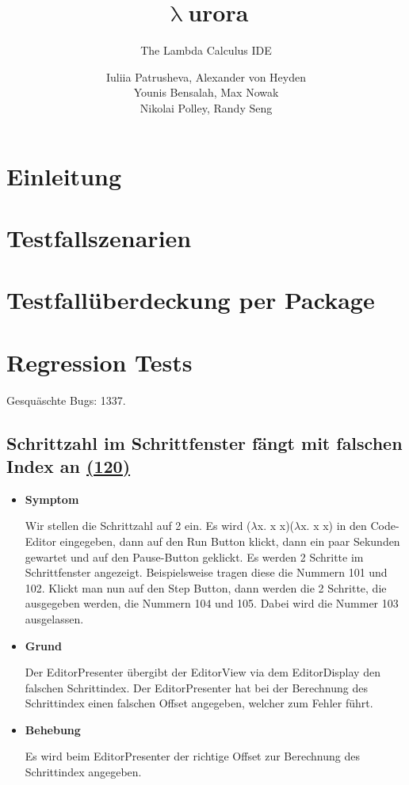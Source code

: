 \documentclass[parskip=full,11pt,twoside]{scrartcl}
\title{\textbf{$\uplambda$}urora}
\subtitle{The Lambda Calculus IDE}
\author{Iuliia Patrusheva, Alexander von Heyden\\
    Younis Bensalah, Max Nowak\\
    Nikolai Polley, Randy Seng}
\newcommand{\issueref}[1]{
    \href{https://git.scc.kit.edu/ap/Aurora/issues/#1}{(#1)}
}
\newcommand{\regrtest}[5]{
    \subsection{#1 \issueref{#2}}
    \begin{itemize}
        \item \textbf{Symptom}
            #3
        \item \textbf{Grund}
            #4
        \item \textbf{Behebung}
            #5
    \end{itemize}
}
\begin{document}
    \maketitle
    \tableofcontents
    \newpage

    \section{Einleitung}


    \section{Testfallszenarien}

    \section{Testfallüberdeckung per Package}

    \section{Regression Tests}
    Gesquäschte Bugs: 1337.
    
    
    \regrtest{Schrittzahl im Schrittfenster fängt mit falschen Index an}{120}{
    	Wir stellen die Schrittzahl auf 2 ein.
		Es wird ($\lambda$x. x x)($\lambda$x. x x) in den Code-Editor eingegeben,  
		dann auf den Run Button klickt, dann ein paar Sekunden gewartet und auf den Pause-Button geklickt. Es werden 2 Schritte im Schrittfenster angezeigt. Beispielsweise tragen diese die Nummern 101 und 102.
		Klickt man nun auf den Step Button, dann werden die 2 Schritte, die ausgegeben werden, die Nummern 104 und 105.
		Dabei wird die Nummer 103 ausgelassen.
    }{
    	Der EditorPresenter übergibt der EditorView via dem EditorDisplay den falschen Schrittindex. 
		Der EditorPresenter hat bei der Berechnung des Schrittindex einen falschen Offset angegeben, welcher zum Fehler führt.
    }{
    	Es wird beim EditorPresenter der richtige Offset zur Berechnung des Schrittindex angegeben. 
    }
    
\end{document}

